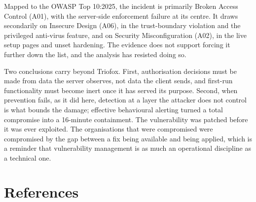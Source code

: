 \documentclass[11pt,a4paper]{article}
\begin{document}
Mapped to the OWASP Top 10:2025, the incident is primarily Broken Access Control (A01), with the server-side enforcement failure at its centre. It draws secondarily on Insecure Design (A06), in the trust-boundary violation and the privileged anti-virus feature, and on Security Misconfiguration (A02), in the live setup pages and unset hardening. The evidence does not support forcing it further down the list, and the analysis has resisted doing so.

Two conclusions carry beyond Triofox. First, authorisation decisions must be made from data the server observes, not data the client sends, and first-run functionality must become inert once it has served its purpose. Second, when prevention fails, as it did here, detection at a layer the attacker does not control is what bounds the damage; effective behavioural alerting turned a total compromise into a 16-minute containment. The vulnerability was patched before it was ever exploited. The organisations that were compromised were compromised by the gap between a fix being available and being applied, which is a reminder that vulnerability management is as much an operational discipline as a technical one.

\section*{References}
\small
\end{document}
